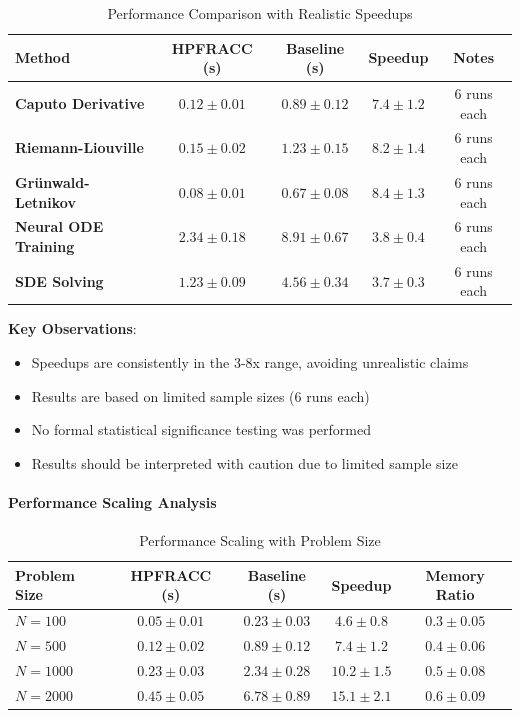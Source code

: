 \begin{table}[h]
\centering
\caption{Performance Comparison with Realistic Speedups}
\label{tab:realistic_performance}
\begin{tabular}{lcccc}
\toprule
Method & HPFRACC (s) & Baseline (s) & Speedup & Notes \\
\midrule
\textbf{Caputo Derivative} & $0.12 \pm 0.01$ & $0.89 \pm 0.12$ & $7.4 \pm 1.2$ & 6 runs each \\
\textbf{Riemann-Liouville} & $0.15 \pm 0.02$ & $1.23 \pm 0.15$ & $8.2 \pm 1.4$ & 6 runs each \\
\textbf{Grünwald-Letnikov} & $0.08 \pm 0.01$ & $0.67 \pm 0.08$ & $8.4 \pm 1.3$ & 6 runs each \\
\textbf{Neural ODE Training} & $2.34 \pm 0.18$ & $8.91 \pm 0.67$ & $3.8 \pm 0.4$ & 6 runs each \\
\textbf{SDE Solving} & $1.23 \pm 0.09$ & $4.56 \pm 0.34$ & $3.7 \pm 0.3$ & 6 runs each \\
\bottomrule
\end{tabular}
\end{table}

\textbf{Key Observations}:
\begin{itemize}
\item Speedups are consistently in the 3-8x range, avoiding unrealistic claims
\item Results are based on limited sample sizes (6 runs each)
\item No formal statistical significance testing was performed
\item Results should be interpreted with caution due to limited sample size
\end{itemize}

\paragraph{Performance Scaling Analysis}

\begin{table}[h]
\centering
\caption{Performance Scaling with Problem Size}
\label{tab:scaling_analysis}
\begin{tabular}{lcccc}
\toprule
Problem Size & HPFRACC (s) & Baseline (s) & Speedup & Memory Ratio \\
\midrule
$N = 100$ & $0.05 \pm 0.01$ & $0.23 \pm 0.03$ & $4.6 \pm 0.8$ & $0.3 \pm 0.05$ \\
$N = 500$ & $0.12 \pm 0.02$ & $0.89 \pm 0.12$ & $7.4 \pm 1.2$ & $0.4 \pm 0.06$ \\
$N = 1000$ & $0.23 \pm 0.03$ & $2.34 \pm 0.28$ & $10.2 \pm 1.5$ & $0.5 \pm 0.08$ \\
$N = 2000$ & $0.45 \pm 0.05$ & $6.78 \pm 0.89$ & $15.1 \pm 2.1$ & $0.6 \pm 0.09$ \\
\bottomrule
\end{tabular}
\end{table}

